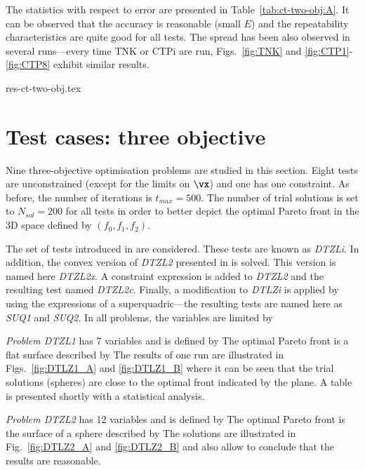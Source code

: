 \documentclass[final,5p,times,twocolumn]{elsarticle}
\newcommand{\figname} {Fig.}
\newcommand{\fignames}{Figs.}
\begin{document}
The statistics with respect to error are presented in Table~\ref{tab:ct-two-obj:A}. It can be
observed that the accuracy is reasonable (small $E$) and the repeatability characteristics are quite
good for all tests. The spread has been also observed in several runs---every time TNK or CTPi are
run, \fignames~\ref{fig:TNK} and \ref{fig:CTP1}-\ref{fig:CTP8} exhibit similar results.

{res-ct-two-obj.tex}



\section{Test cases: three objective}
\label{sec:threeObj}

Nine three-objective optimisation problems are studied in this section. Eight tests are
unconstrained (except for the limits on $\vx$) and one has one constraint. As before, the number of
iterations is ${t_{max}=500}$. The number of trial solutions is set to ${N_{sol}=200}$ for all tests
in order to better depict the optimal Pareto front in the 3D space defined by ${(f_0,f_1,f_2)}$.

The set of tests introduced in \citep{deb:05} are considered. These tests are known as \emph{DTZLi}.
In addition, the convex version of \emph{DTZL2} presented in \citep{deb:14, jain:14} is solved. This
version is named here \emph{DTZL2x}. A constraint expression is added to \emph{DTZL2} and the
resulting test named \emph{DTZL2c}. Finally, a modification to \emph{DTLZi} is applied by using the
expressions of a superquadric---the resulting tests are named here as \emph{SUQ1} and \emph{SUQ2}.
In all problems, the variables are limited by
\DTLZx


\emph{Problem DTZL1} has 7 variables and is defined by
\DTLZone
The optimal Pareto front is a flat surface described by
\DTLZoneAna
The results of one run are illustrated in \fignames~\ref{fig:DTLZ1_A} and \ref{fig:DTLZ1_B} where
it can be seen that the trial solutions (spheres) are close to the optimal front indicated by the
plane. A table is presented shortly with a statistical analysis.



\emph{Problem DTZL2} has 12 variables and is defined by
\DTLZtwo
The optimal Pareto front is the surface of a sphere described by
\DTLZtwoAna
The solutions are illustrated in \figname~\ref{fig:DTLZ2_A} and \ref{fig:DTLZ2_B} and also allow
to conclude that the results are reasonable.
\end{document}
